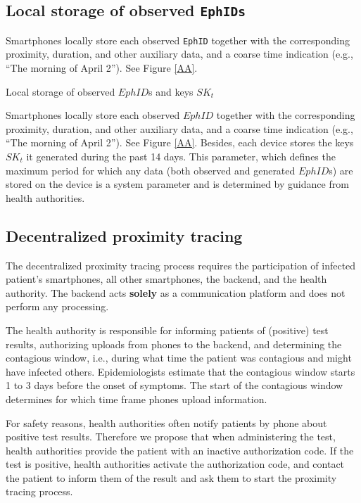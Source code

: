 \documentclass[10.8pt,a4paper]{article}
\begin{document}
\subsection{Local storage of observed \texttt{EphIDs}}

Smartphones locally store each observed \texttt{EphID} together with the corresponding proximity, duration, and other auxiliary data, and a coarse time indication (e.g., “The morning of April 2”). See Figure \ref{AA}.

Local storage of observed $EphID$s and keys $SK_t$

Smartphones locally store each observed $EphID$ together with the corresponding proximity, duration, and other auxiliary data, and a coarse time indication (e.g., “The morning of April 2”). See Figure \ref{AA}. Besides, each device stores the keys $SK_t$ it generated during the past 14 days. This parameter, which defines the maximum period for which any data (both observed and generated $EphID$s) are stored on the device is a system parameter and is determined by guidance from health authorities.

\subsection{Decentralized proximity tracing}
The decentralized proximity tracing process requires the participation of infected patient’s smartphones, all other smartphones, the backend, and the health authority. The backend acts \textbf{solely}  as a communication platform and does not perform any processing.

The health authority is responsible for informing patients of (positive) test results, authorizing uploads from phones to the backend, and determining the contagious window, i.e., during what time the patient was contagious and might have infected others. Epidemiologists estimate that the contagious window starts 1 to 3 days before the onset of symptoms. The start of the contagious window determines for which time frame phones upload information.

For safety reasons, health authorities often notify patients by phone about positive test results. Therefore we propose that when administering the test, health authorities provide the patient with an inactive authorization code. If the test is positive, health authorities activate the authorization code, and contact the patient to inform them of the result and ask them to start the proximity tracing process.
\end{document}
